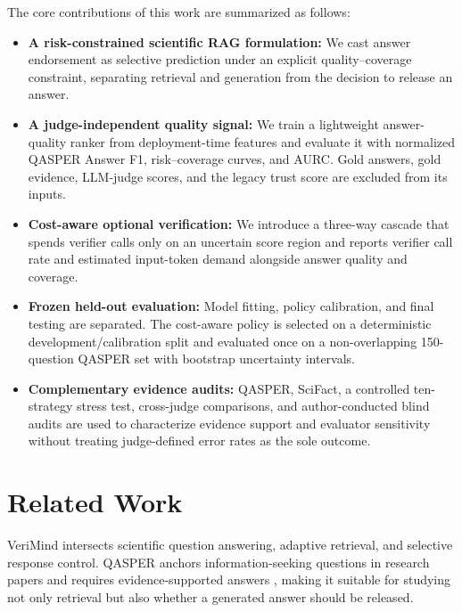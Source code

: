 \documentclass[smallextended]{svjour3}
\begin{document}
The core contributions of this work are summarized as follows:
\begin{itemize}
    \item \textbf{A risk-constrained scientific RAG formulation:} We cast answer endorsement as selective prediction under an explicit quality--coverage constraint, separating retrieval and generation from the decision to release an answer.

    \item \textbf{A judge-independent quality signal:} We train a lightweight answer-quality ranker from deployment-time features and evaluate it with normalized QASPER Answer F1, risk--coverage curves, and AURC. Gold answers, gold evidence, LLM-judge scores, and the legacy trust score are excluded from its inputs.

    \item \textbf{Cost-aware optional verification:} We introduce a three-way cascade that spends verifier calls only on an uncertain score region and reports verifier call rate and estimated input-token demand alongside answer quality and coverage.

    \item \textbf{Frozen held-out evaluation:} Model fitting, policy calibration, and final testing are separated. The cost-aware policy is selected on a deterministic development/calibration split and evaluated once on a non-overlapping 150-question QASPER set with bootstrap uncertainty intervals.

    \item \textbf{Complementary evidence audits:} QASPER, SciFact, a controlled ten-strategy stress test, cross-judge comparisons, and author-conducted blind audits are used to characterize evidence support and evaluator sensitivity without treating judge-defined error rates as the sole outcome.
\end{itemize}

\section{Related Work}
\label{sec:related_work}

VeriMind intersects scientific question answering, adaptive retrieval, and selective response control. QASPER anchors information-seeking questions in research papers and requires evidence-supported answers \citep{dasigi2021dataset}, making it suitable for studying not only retrieval but also whether a generated answer should be released.
\end{document}
